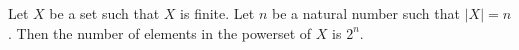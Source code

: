 \documentclass{article}
\begin{document}
\begin{forthel}
\begin{theorem}
Let $X$ be a set such that $X$ is finite. Let $n$ be a natural number such that $|X|=n$.
Then the number of elements in the powerset of $X$ is $2^{n}$.
\end{theorem}
\end{forthel}
\end{document}
